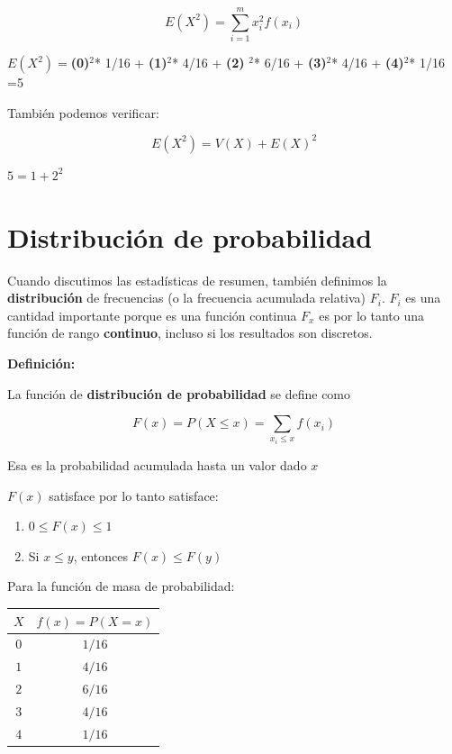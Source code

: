 \documentclass[
]{book}
\providecommand{\tightlist}{%
  \setlength{\itemsep}{0pt}\setlength{\parskip}{0pt}}
\begin{document}
\[E(X^2) =\sum_{i=1}^m x_i^2 f(x_i)\]

\(E(X^2)=\)\textbf{(0)}\(^2\)* 1/16 + \textbf{(1)}\(^2\)* 4/16 + \textbf{(2)} \(^2\)* 6/16 + \textbf{(3)}\(^2\)* 4/16 + \textbf{(4)}\(^2\)* 1/16 =5

También podemos verificar:

\[E(X^2)=V(X)+E(X)^2\]

\(5=1+2^2\)

\hypertarget{distribuciuxf3n-de-probabilidad}{%
\section{Distribución de probabilidad}\label{distribuciuxf3n-de-probabilidad}}

Cuando discutimos las estadísticas de resumen, también definimos la \textbf{distribución} de frecuencias (o la frecuencia acumulada relativa) \(F_i\). \(F_i\) es una cantidad importante porque es una función continua \(F_x\) es por lo tanto una función de rango \textbf{continuo}, incluso si los resultados son discretos.

\textbf{Definición:}

La función de \textbf{distribución de probabilidad} se define como

\[F(x)=P(X\leq x)=\sum_{x_i\leq x} f(x_i) \]

Esa es la probabilidad acumulada hasta un valor dado \(x\)

\(F(x)\) satisface por lo tanto satisface:

\begin{enumerate}
\def\labelenumi{\arabic{enumi})}
\tightlist
\item
  \(0\leq F(x) \leq 1\)
\item
  Si \(x \leq y\), entonces \(F(x) \leq F(y)\)
\end{enumerate}

Para la función de masa de probabilidad:

\begin{longtable}[]{@{}cc@{}}
\toprule\noalign{}
\(X\) & \(f(x)=P(X=x)\) \\
\midrule\noalign{}
\endhead
\bottomrule\noalign{}
\endlastfoot
\(0\) & \(1/16\) \\
\(1\) & \(4/16\) \\
\(2\) & \(6/16\) \\
\(3\) & \(4/16\) \\
\(4\) & \(1/16\) \\
\end{longtable}
\end{document}
